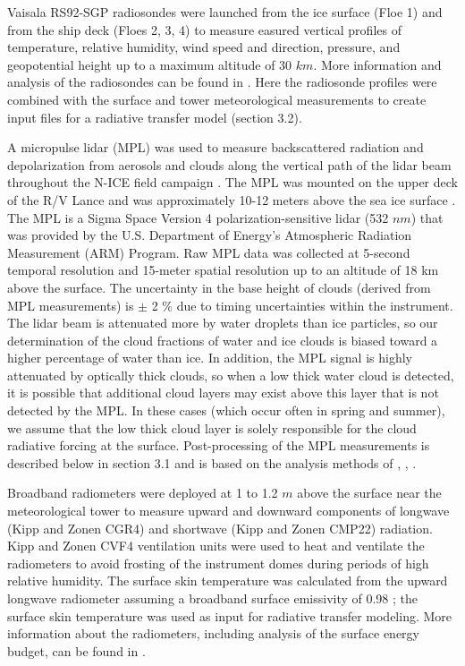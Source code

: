 Vaisala RS92-SGP radiosondes were launched from the ice surface (Floe 1) and from the ship deck (Floes 2, 3, 4) to measure easured vertical profiles of temperature, relative humidity, wind speed and direction, pressure, and geopotential height up to a maximum altitude of 30 $km$. More information and analysis of the radiosondes can be found in \citep{kayser:2017}. Here the radiosonde profiles were combined with the surface and tower meteorological measurements to create input files for a radiative transfer model (section 3.2).

A micropulse lidar (MPL) was used to measure backscattered radiation and depolarization from aerosols and clouds along the vertical path of the lidar beam throughout the N-ICE field campaign \citep{spinhirne}. The MPL was mounted on the upper deck of the R/V Lance and was approximately 10-12 meters above the sea ice surface \citep{campbell:2002}. The MPL is a Sigma Space Version 4 polarization-sensitive lidar (532 $nm$) that was provided by the U.S. Department of Energy’s Atmospheric Radiation Measurement (ARM) Program. Raw MPL data was collected at 5-second temporal resolution and 15-meter spatial resolution up to an altitude of 18 km above the surface. The uncertainty in the base height of clouds (derived from MPL measurements) is $\pm$ 2 $\%$ due to timing uncertainties within the instrument. The lidar beam is attenuated more by water droplets than ice particles, so our determination of the cloud fractions of water and ice clouds is biased toward a higher percentage of water than ice. In addition, the MPL signal is highly attenuated by optically thick clouds, so when a low thick water cloud is detected, it is possible that additional cloud layers may exist above this layer that is not detected by the MPL. In these cases (which occur often in spring and summer), we assume that the low thick cloud layer is solely responsible for the cloud radiative forcing at the surface. Post-processing of the MPL measurements is described below in section 3.1 and is based on the analysis methods of \citet{campbell:2002}, \citet{flynn:2007}, \citet{stillwell:2018}.

Broadband radiometers were deployed at 1 to 1.2 $m$ above the surface near the meteorological tower to measure upward and downward components of longwave (Kipp and Zonen CGR4) and shortwave (Kipp and Zonen CMP22) radiation. Kipp and Zonen CVF4 ventilation units were used to heat and ventilate the radiometers to avoid frosting of the instrument domes during periods of high relative humidity. The surface skin temperature was calculated from the upward longwave radiometer assuming a broadband surface emissivity of 0.98 \citep{grenfell:1999}; the surface skin temperature was used as input for radiative transfer modeling. More information about the radiometers, including analysis of the surface energy budget, can be found in \citet{walden:2017}.

